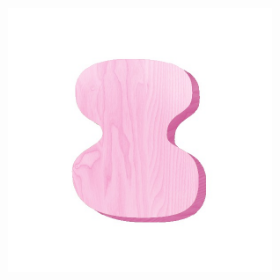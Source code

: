\begin{figure}[h!]
\begin{center}
\begin{subfigure}[b]{0.3\textwidth}
\begin{center}
\begin{subfigure}[b]{0.4\textwidth}
                \end{subfigure}
            \end{center}
        \end{subfigure}
        \begin{subfigure}[b]{0.3\textwidth}
            \begin{center}
                \begin{subfigure}[b]{0.4\textwidth}
                    \includegraphics[width=\linewidth]{figures/artist_objects/fake5_wood_pink.jpg}
                \end{subfigure}
                \begin{subfigure}[b]{0.4\textwidth}

\end{subfigure}
\end{center}
\end{subfigure}
\end{center}
\end{figure}
